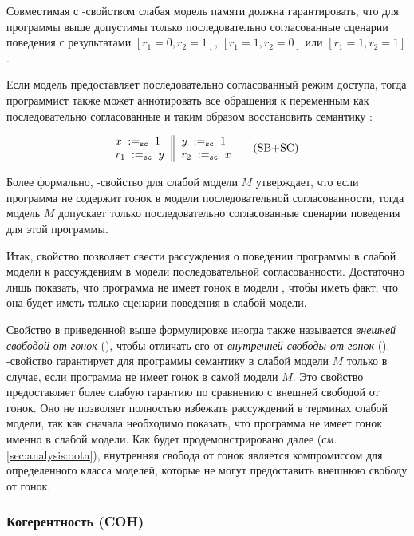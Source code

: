 Совместимая с \DRF-свойством слабая модель памяти должна гарантировать, 
что для программы выше допустимы только 
последовательно согласованные сценарии поведения с результатами
${[r_1=0, r_2=1]}$, ${[r_1=1,r_2=0]}$ или ${[r_1=1,r_2=1]}$.

Если модель предоставляет последовательно согласованный 
режим доступа, тогда программист также может 
аннотировать все обращения к переменным как последовательно согласованные
и таким образом восстановить семантику \SC:
 
\begin{equation*}
\inarrII{
   \writeInst{\sco}{x}{1}   \\
   \readInst{\sco}{r_1}{y}  \\
}{
   \writeInst{\sco}{y}{1}   \\
   \readInst{\sco}{r_2}{x}  \\
}
\tag{SB+SC}\label{ex:sb-sc}
\end{equation*}

Более формально, \DRF-свойство для слабой модели $M$
утверждает, что если программа не содержит гонок в модели 
последовательной согласованности, тогда модель $M$
допускает только последовательно согласованные 
сценарии поведения для этой программы.

Итак, свойство \DRF позволяет свести рассуждения о поведении программы 
в слабой модели к рассуждениям в модели последовательной согласованности.
Достаточно лишь показать, что программа не имеет гонок 
в модели \SC, чтобы иметь факт, что она будет иметь только \SC 
сценарии поведения в слабой модели. 

Свойство \DRF в приведенной  выше формулировке иногда также называется
\emph{внешней свободой от гонок} (\eDRF), 
чтобы отличать его от \emph{внутренней свободы от гонок} (\iDRF).
\iDRF-свойство гарантирует для программы семантику \SC
в слабой модели $M$ только в случае, если программа 
не имеет гонок в самой модели $M$.
Это свойство предоставляет более слабую гарантию
по сравнению с внешней свободой от гонок. 
Оно не позволяет полностью избежать рассуждений 
в терминах слабой модели, так как 
сначала необходимо показать, что программа не имеет гонок именно в слабой модели. 
Как будет продемонстрировано далее (\emph{см.} \cref{sec:analysis:oota}), 
внутренняя свобода от гонок является компромиссом 
для определенного класса моделей, которые не могут 
предоставить внешнюю свободу от гонок. 

\subsubsection{Когерентность (COH)}
\label{sec:background:coh}

